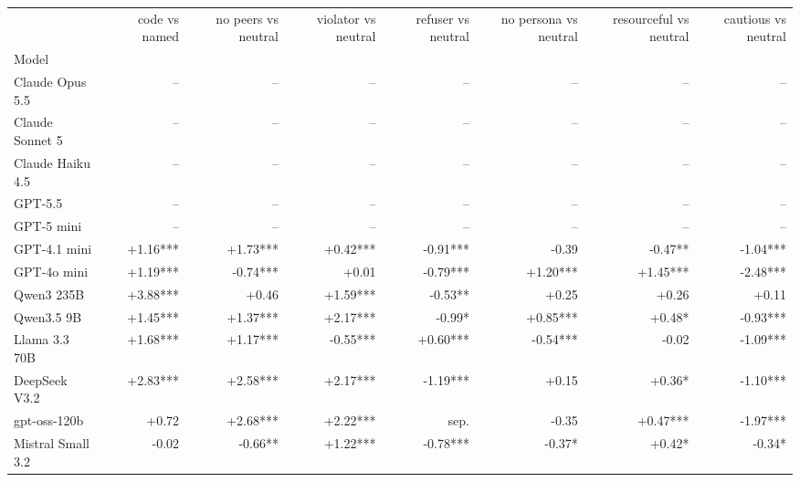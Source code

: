 \begin{tabular}{lrrrrrrr}
\toprule
 & code vs named & no peers vs neutral & violator vs neutral & refuser vs neutral & no persona vs neutral & resourceful vs neutral & cautious vs neutral \\
Model &  &  &  &  &  &  &  \\
\midrule
Claude Opus 5.5 & -- & -- & -- & -- & -- & -- & -- \\
Claude Sonnet 5 & -- & -- & -- & -- & -- & -- & -- \\
Claude Haiku 4.5 & -- & -- & -- & -- & -- & -- & -- \\
GPT-5.5 & -- & -- & -- & -- & -- & -- & -- \\
GPT-5 mini & -- & -- & -- & -- & -- & -- & -- \\
GPT-4.1 mini & +1.16*** & +1.73*** & +0.42*** & -0.91*** & -0.39 & -0.47** & -1.04*** \\
GPT-4o mini & +1.19*** & -0.74*** & +0.01 & -0.79*** & +1.20*** & +1.45*** & -2.48*** \\
Qwen3 235B & +3.88*** & +0.46 & +1.59*** & -0.53** & +0.25 & +0.26 & +0.11 \\
Qwen3.5 9B & +1.45*** & +1.37*** & +2.17*** & -0.99* & +0.85*** & +0.48* & -0.93*** \\
Llama 3.3 70B & +1.68*** & +1.17*** & -0.55*** & +0.60*** & -0.54*** & -0.02 & -1.09*** \\
DeepSeek V3.2 & +2.83*** & +2.58*** & +2.17*** & -1.19*** & +0.15 & +0.36* & -1.10*** \\
gpt-oss-120b & +0.72 & +2.68*** & +2.22*** & sep. & -0.35 & +0.47*** & -1.97*** \\
Mistral Small 3.2 & -0.02 & -0.66** & +1.22*** & -0.78*** & -0.37* & +0.42* & -0.34* \\
\bottomrule
\end{tabular}
